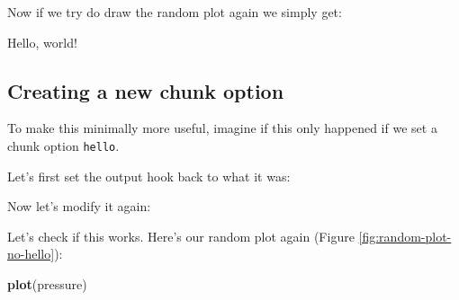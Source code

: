 \documentclass[sigchi, ]{acmart}
\newenvironment{Shaded}{\begin{snugshade}}{\end{snugshade}}
\newcommand{\ControlFlowTok}[1]{\textcolor[rgb]{0.13,0.29,0.53}{\textbf{#1}}}
\newcommand{\DataTypeTok}[1]{\textcolor[rgb]{0.13,0.29,0.53}{#1}}
\newcommand{\KeywordTok}[1]{\textcolor[rgb]{0.13,0.29,0.53}{\textbf{#1}}}
\newcommand{\NormalTok}[1]{#1}
\newcommand{\OperatorTok}[1]{\textcolor[rgb]{0.81,0.36,0.00}{\textbf{#1}}}
\newcommand{\StringTok}[1]{\textcolor[rgb]{0.31,0.60,0.02}{#1}}
\begin{document}
Now if we try do draw the random plot again we simply get:

Hello, world!

\hypertarget{creating-a-new-chunk-option}{%
\subsection{Creating a new chunk option}\label{creating-a-new-chunk-option}}

To make this minimally more useful, imagine if this only happened if we set a chunk option \texttt{hello}.

Let's first set the output hook back to what it was:

\begin{Shaded}
\end{Shaded}

Now let's modify it again:

\begin{Shaded}
\end{Shaded}

Let's check if this works. Here's our random plot again (Figure \ref{fig:random-plot-no-hello}):

\begin{Shaded}
\begin{Highlighting}[]
\KeywordTok{plot}\NormalTok{(pressure)}
\end{Highlighting}
\end{Shaded}
\end{document}
